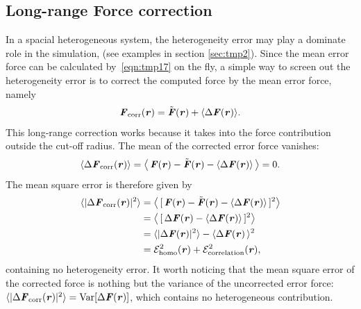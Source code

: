 \documentclass[aps,pre,preprint]{revtex4}
\renewcommand{\v}[1]{\textbf{\textit{#1}}}
\renewcommand{\d}[1]{\textsf{#1}}
\begin{document}

\subsection{Long-range Force correction}

In a spacial heterogeneous system, the heterogeneity error may play a
dominate role in the simulation, (see examples in section
\ref{sec:tmp2}).  Since the mean error force can be calculated
by~\eqref{eqn:tmp17} on the fly, a simple way to screen out the
heterogeneity error is to correct the computed force by the mean error
force, namely
\begin{align}\label{eqn:define-fcorr}
  \v F_{\textrm{corr}}(\v r) = \tilde{\v F}(\v r) + \langle\Delta\v F(\v r)\rangle.
\end{align}
This long-range correction works because it takes into the force
contribution outside the cut-off radius. The mean of the corrected
error force vanishes:
\begin{align}\label{eqn:mean-fcorr}
  \langle\Delta\v F_{\textrm{corr}}(\v r)\rangle
   =
  \big\langle\,
  \v F(\v r) - \tilde{\v F}(\v r) - \langle\Delta\v F(\v r)\rangle\,
  \big\rangle = 0.
\end{align}
The mean square error is therefore given by
\begin{align} \nonumber
  \langle\vert\Delta\v F_{\textrm{corr}}(\v r)\vert^2\rangle
  & =
  \big\langle\,
  [\,\v F(\v r) - \tilde{\v F}(\v r) - \langle\Delta\v F(\v r)\rangle\,]^2
  \big\rangle \\\nonumber
  & =
  \big\langle\,
  [\,\Delta\v F(\v r) - \langle\Delta\v F(\v r)\rangle\,]^2
  \big\rangle \\\nonumber
  & =
  \langle\vert\Delta\v F(\v r)\vert^2\rangle -
  \langle\Delta\v F(\v r)\,\rangle^2 \\
  & =
  \mathcal E^2_{\textrm{homo}}(\v r) +
  \mathcal E^2_{\textrm{correlation}}(\v r),
\end{align}
containing no heterogeneity error.  It worth noticing that the mean
square error of the corrected force is nothing but the variance of the
uncorrected error force: $\langle\vert\Delta\v F_{\textrm{corr}}(\v
r)\vert^2\rangle = \textrm{Var}[\Delta\v F(\v r)]$, which contains no
heterogeneous contribution.
\end{document}
